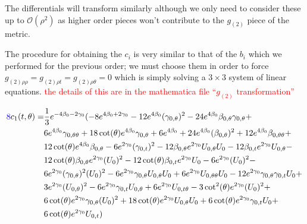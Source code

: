 \documentclass[a4paper,11pt]{article}
\numberwithin{equation}{section}
\begin{document}
The differentials will transform similarly although we only need to consider these up to $\mathcal{O}(\rho^2)$ as higher order pieces won't contribute to the $g_{(2)}$ piece of the metric. \par

The procedure for obtaining the $c_i$ is very similar to that of the $b_i$ which we performed for the previous order; we must choose them in order to force $g_{(2) \rho \rho}=g_{(2) \rho t}=g_{(2) \rho \theta}=0$ which is simply solving a $3 \times 3$ system of linear equations. \textcolor{red}{the details of this are in the mathematica file ``$g_{(2)}$ transformation''} 

\begin{subequations}
\begin{align}
\begin{split}
\textcolor{blue}{8}c_1(t,\theta)=&\frac{1}{3} e^{-4\beta_{0}-2 \gamma_{0}} (-8 e^{4\beta_{0}+2 \gamma_{0}}-12 e^{4\beta_{0}} (\gamma_{0, \theta})^2-24 e^{4\beta_{0}}\beta_{0, \theta} \gamma_{0, \theta}+\\
&6 e^{4\beta_{0}} \gamma_{0, \theta \theta}+18 \cot (\theta ) e^{4\beta_{0}} \gamma_{0, \theta}+6 e^{4\beta_{0}}+24 e^{4\beta_{0}} (\beta_{0, \theta})^2+12 e^{4\beta_{0}}\beta_{0, \theta \theta}+\\
&12 \cot (\theta ) e^{4\beta_{0}}\beta_{0, \theta}-6 e^{2 \gamma_{0}} (\gamma_{0, t})^2-12\beta_{0, \theta} e^{2 \gamma_{0}} U_{0,\theta} U_{0}-12\beta_{0, t} e^{2 \gamma_{0}} U_{0,\theta}-\\
&12 \cot (\theta )\beta_{0, \theta} e^{2 \gamma_{0}} (U_{0})^2-12 \cot (\theta )\beta_{0, t} e^{2 \gamma_{0}} U_{0}-6 e^{2 \gamma_{0}} (U_{0})^2-\\
&6 e^{2 \gamma_{0}} (\gamma_{0, \theta})^2 (U_{0})^2-6 e^{2 \gamma_{0}} \gamma_{0, \theta} U_{0,\theta} U_{0}+6 e^{2 \gamma_{0}} U_{0,\theta \theta} U_{0}-12 e^{2 \gamma_{0}} \gamma_{0, \theta} \gamma_{0, t} U_{0}+\\
&3 e^{2 \gamma_{0}} (U_{0,\theta})^2-6 e^{2 \gamma_{0}} \gamma_{0, t} U_{0,\theta}+6 e^{2 \gamma_{0}} U_{0,t \theta}-3 \cot ^2(\theta ) e^{2 \gamma_{0}} (U_{0})^2+\\
&6 \cot (\theta ) e^{2 \gamma_{0}} \gamma_{0, \theta} (U_{0})^2+18 \cot (\theta ) e^{2 \gamma_{0}} U_{0,\theta} U_{0}+6 \cot (\theta ) e^{2 \gamma_{0}} \gamma_{0, t} U_{0}+\\
&6 \cot (\theta ) e^{2 \gamma_{0}} U_{0,t})
\end{split}
\end{align}


\end{subequations}
\end{document}
